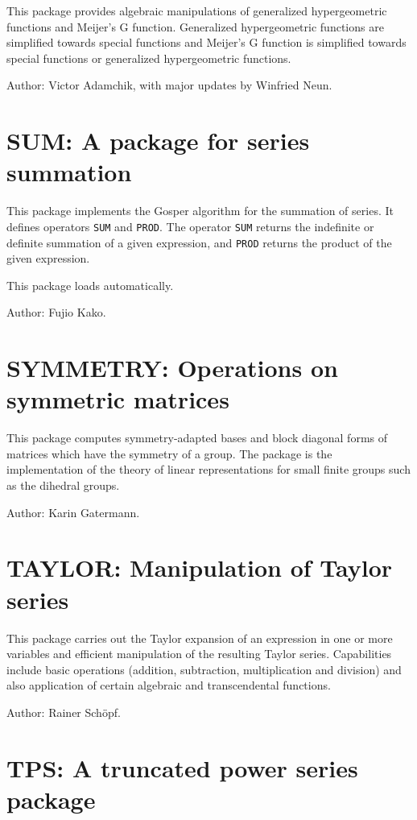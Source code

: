 
This package provides algebraic manipulations of generalized
hypergeometric functions and Meijer's G function.  Generalized
hypergeometric functions are simplified towards special functions and
Meijer's G function is simplified towards special functions or generalized
hypergeometric functions.

Author: Victor Adamchik, with major updates by Winfried Neun.

\section{SUM: A package for series summation} 

This package implements the Gosper algorithm for the summation of series.
It defines operators {\tt SUM} and {\tt PROD}.  The operator {\tt SUM}
returns the indefinite or definite summation of a given expression, and
{\tt PROD} returns the product of the given expression.

This package loads automatically.

Author: Fujio Kako.

\section{SYMMETRY: Operations on symmetric matrices} 

This package computes symmetry-adapted bases and block diagonal forms of
matrices which have the symmetry of a group.  The package is the
implementation of the theory of linear representations for small finite
groups such as the dihedral groups.

Author: Karin Gatermann.

\section{TAYLOR: Manipulation of Taylor series}

This package carries out the Taylor expansion of an expression in one or
more variables and efficient manipulation of the resulting Taylor series.
Capabilities include basic operations (addition, subtraction,
multiplication and division) and also application of certain algebraic and
transcendental functions.

Author: Rainer Sch\"opf.

\section{TPS: A truncated power series package}  

